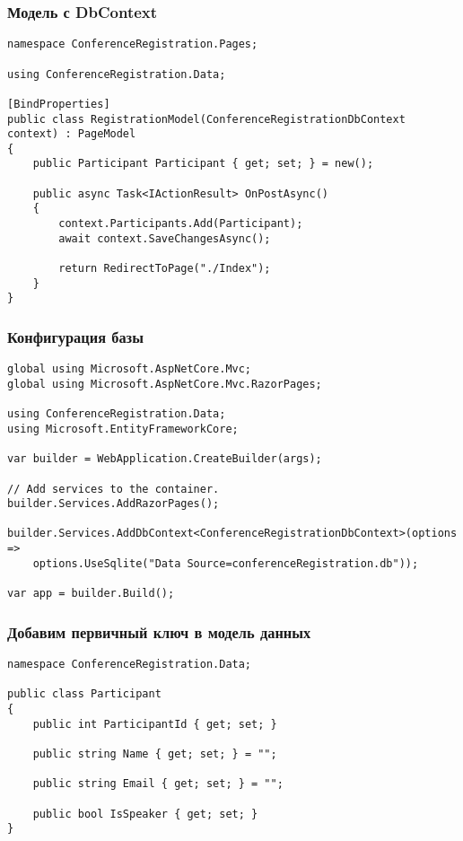 \documentclass{../../slides-style}
\begin{document}
    \begin{frame}[fragile]
        \frametitle{Модель с DbContext}
        \begin{scriptsize}
            \begin{verbatim}
namespace ConferenceRegistration.Pages;

using ConferenceRegistration.Data;

[BindProperties]
public class RegistrationModel(ConferenceRegistrationDbContext context) : PageModel
{
    public Participant Participant { get; set; } = new();

    public async Task<IActionResult> OnPostAsync()
    {
        context.Participants.Add(Participant);
        await context.SaveChangesAsync();

        return RedirectToPage("./Index");
    }
}
            \end{verbatim}
        \end{scriptsize}
    \end{frame}

    \begin{frame}[fragile]
        \frametitle{Конфигурация базы}
        \begin{footnotesize}
            \begin{verbatim}
global using Microsoft.AspNetCore.Mvc;
global using Microsoft.AspNetCore.Mvc.RazorPages;

using ConferenceRegistration.Data;
using Microsoft.EntityFrameworkCore;

var builder = WebApplication.CreateBuilder(args);

// Add services to the container.
builder.Services.AddRazorPages();

builder.Services.AddDbContext<ConferenceRegistrationDbContext>(options =>
    options.UseSqlite("Data Source=conferenceRegistration.db"));

var app = builder.Build();
            \end{verbatim}
        \end{footnotesize}
    \end{frame}

    \begin{frame}[fragile]
        \frametitle{Добавим первичный ключ в модель данных}
        \begin{footnotesize}
            \begin{verbatim}
namespace ConferenceRegistration.Data;

public class Participant
{
    public int ParticipantId { get; set; }

    public string Name { get; set; } = "";

    public string Email { get; set; } = "";

    public bool IsSpeaker { get; set; }
}
            \end{verbatim}
        \end{footnotesize}
    \end{frame}
\end{document}
